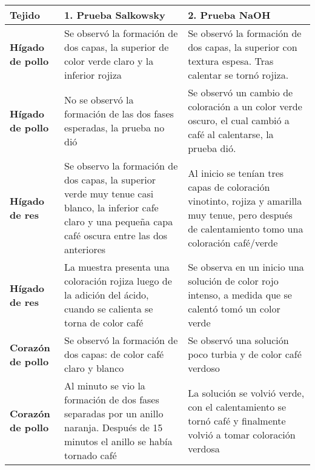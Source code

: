 \begin{table*}[h!]
	\small
	\caption{Resultados obtenidos para los distintos tejidos con las pruebas espec\'ificas a l\'ipidos.}
	\label{tb: lipidos}
	\begin{tabular}{p{2.5cm}|p{7cm}p{7cm}}
		\hline
		\textbf{Tejido} & \textbf{1. Prueba Salkowsky} & \textbf{2. Prueba NaOH}
		\\
		\hline
		\textbf{H\'igado de pollo} & Se observó la formación de dos capas, la superior de color verde claro y la inferior rojiza & Se observó la formación de dos capas, la superior con textura espesa. Tras calentar se tornó rojiza. 
		\\
		\hline
		\textbf{H\'igado de pollo} & No se observó la formación de las dos fases esperadas, la prueba no dió & Se observó un cambio de coloración a un color verde oscuro, el cual cambió a café al calentarse, la prueba dió.
		\\
		\hline
		
		\textbf{H\'igado de res} & Se observo la formaci\'on de dos capas, la superior verde muy tenue casi blanco, la inferior cafe claro y una pequeña capa caf\'e oscura entre las dos anteriores & Al inicio se ten\'ian tres capas de coloraci\'on vinotinto, rojiza y amarilla muy tenue, pero despu\'es de calentamiento tomo una coloraci\'on caf\'e/verde
		\\
		\hline
		
		\textbf{H\'igado de res} & La muestra presenta una coloración rojiza luego de la adición del ácido, cuando se calienta se torna de color café & Se observa en un inicio una solución de color rojo intenso, a medida que se calentó tomó un color verde
		\\
		\hline
		
		\textbf{Coraz\'on de pollo} & Se observó la formaci\'on de dos capas: de color caf\'e claro y blanco & Se observó una solución poco turbia y de color caf\'e verdoso
		\\
		\hline
		
		\textbf{Coraz\'on de pollo} & Al minuto se vio la formaci\'on de dos fases separadas por un anillo naranja. Despu\'es de 15 minutos el anillo se hab\'ia tornado café & La soluci\'on se volvi\'o verde, con el calentamiento se tornó caf\'e y finalmente volvi\'o a tomar coloraci\'on verdosa
		\\
		\hline
		

\end{tabular}
\end{table*}
